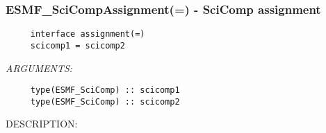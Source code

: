  
\setlength{\oldparskip}{\parskip}
\setlength{\parskip}{1.5ex}
\setlength{\oldparindent}{\parindent}
\setlength{\parindent}{0pt}
\setlength{\oldbaselineskip}{\baselineskip}
\setlength{\baselineskip}{11pt}
 
\def\bv{\begin{verbatim}}
\def\ev{\end{verbatim}}
\def\be{\begin{equation}}
\def\ee{\end{equation}}
\def\bea{\begin{eqnarray}}
\def\eea{\end{eqnarray}}
\def\bi{\begin{itemize}}
\def\ei{\end{itemize}}
\def\bn{\begin{enumerate}}
\def\en{\end{enumerate}}
\def\bd{\begin{description}}
\def\ed{\end{description}}
\def\({\left (}
\def\){\right )}
\def\[{\left [}
\def\]{\right ]}
\def\<{\left  \langle}
\def\>{\right \rangle}
\def\cI{{\cal I}}
\def\diag{\mathop{\rm diag}}
\def\tr{\mathop{\rm tr}}


 
\subsubsection [ESMF\_SciCompAssignment(=)] {ESMF\_SciCompAssignment(=) - SciComp assignment}


  
\begin{verbatim}     interface assignment(=)
     scicomp1 = scicomp2\end{verbatim}{\em ARGUMENTS:}
\begin{verbatim}     type(ESMF_SciComp) :: scicomp1
     type(ESMF_SciComp) :: scicomp2\end{verbatim}
{\sf DESCRIPTION:\\ }


